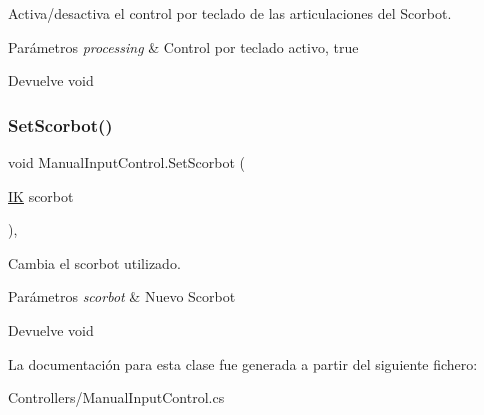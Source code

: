 Activa/desactiva el control por teclado de las articulaciones del Scorbot. 
\begin{DoxyParams}{Parámetros}
{\em processing} & Control por teclado activo, true \\
\hline
\end{DoxyParams}
\begin{DoxyReturn}{Devuelve}
void 
\end{DoxyReturn}
\mbox{\label{class_manual_input_control_a89c690df272f067ef8eef89ac0108e78}} 
\subsubsection{\texorpdfstring{SetScorbot()}{SetScorbot()}}
{\footnotesize\ttfamily void Manual\+Input\+Control.\+Set\+Scorbot (\begin{DoxyParamCaption}\item[{\mbox{\hyperlink{class_i_k}{IK}}}]{scorbot }\end{DoxyParamCaption})\hspace{0.3cm}{\ttfamily [inline]}, {\ttfamily [private]}}

Cambia el scorbot utilizado. 
\begin{DoxyParams}{Parámetros}
{\em scorbot} & Nuevo Scorbot \\
\hline
\end{DoxyParams}
\begin{DoxyReturn}{Devuelve}
void 
\end{DoxyReturn}


La documentación para esta clase fue generada a partir del siguiente fichero\+:\begin{DoxyCompactItemize}
\item 
Controllers/Manual\+Input\+Control.\+cs\end{DoxyCompactItemize}
